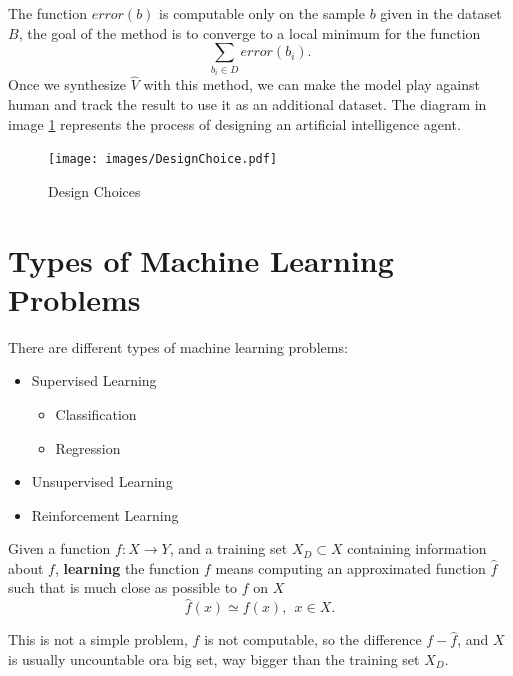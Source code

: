 \documentclass[10pt, letterpaper]{report}
\begin{document}
The function $error(b)$ is computable only on the sample $b$ given in the dataset $B$, the goal of the method is to converge to a local minimum for the function  \begin{equation}
	\sum_{b_i\in D}error(b_i).
\end{equation}
Once we synthesize $\hat V$ with this method, we can make the model play against human and track the result to use it as an additional dataset. The diagram in image \ref{img:DesignChoice} represents the process of designing an artificial intelligence agent.

\begin{figure}[h!]
	\centering
	\texttt{[image: images/DesignChoice.pdf]}
	\caption{Design Choices}
	\label{img:DesignChoice}
\end{figure}
\section{Types of Machine Learning Problems}
There are different types of machine learning problems:\begin{itemize}
	\item Supervised Learning\begin{itemize}
		      \item Classification
		      \item Regression
	      \end{itemize}
	\item Unsupervised Learning
	\item Reinforcement Learning
\end{itemize}

\begin{definition}
	Given a function $f:X\rightarrow Y$, and a training set $X_D\subset X$ containing information about $f$, \textbf{learning} the function $f$ means computing an approximated function $\hat f$ such that is much close as possible to $f$ on $X$\begin{equation}
		\hat f(x)\simeq f(x), \ \ x\in X.
	\end{equation}
\end{definition}
This is not a simple problem, $f$ is not computable, so the difference $f-\hat f$, and $X$ is usually uncountable ora big set, way bigger than the training set $X_D$. \bigskip
\end{document}
